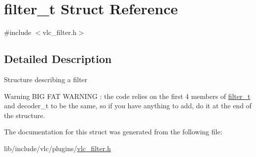 \hypertarget{structfilter__t}{}\section{filter\+\_\+t Struct Reference}
\label{structfilter__t}


{\ttfamily \#include $<$vlc\+\_\+filter.\+h$>$}



\subsection{Detailed Description}
Structure describing a filter \begin{DoxyWarning}{Warning}
B\+IG F\+AT W\+A\+R\+N\+I\+NG \+: the code relies on the first 4 members of \hyperlink{structfilter__t}{filter\+\_\+t} and decoder\+\_\+t to be the same, so if you have anything to add, do it at the end of the structure. 
\end{DoxyWarning}


The documentation for this struct was generated from the following file\+:\begin{DoxyCompactItemize}
\item 
lib/include/vlc/plugins/\hyperlink{vlc__filter_8h}{vlc\+\_\+filter.\+h}\end{DoxyCompactItemize}
